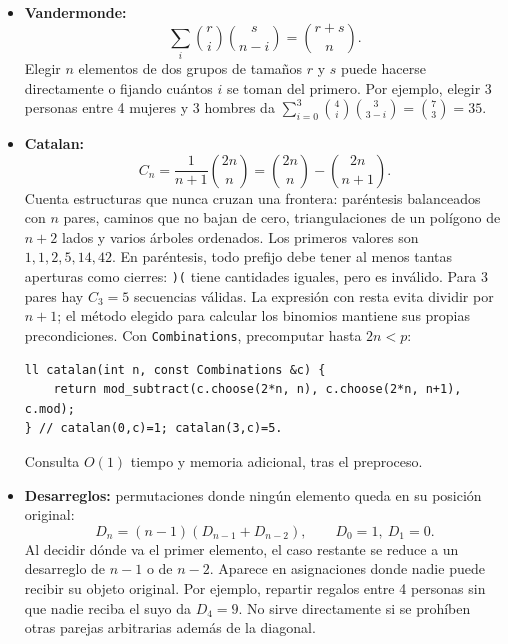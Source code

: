 \begin{itemize}
\begin{lstlisting}[style=cpp]
ll bounded_distributions(int n, const vector<int> &upper,
                         const Combinations &c) {
    int k = upper.size();
    assert(n >= 0 && 1 <= k && k < 63);
    ll answer = 0;
    for (unsigned long long mask = 0; mask < (1ULL << k); ++mask) {
        ll remaining = n;
        for (int i = 0; i < k; ++i) if (mask >> i & 1ULL)
            remaining -= (ll)upper[i] + 1;
        if (remaining < 0) continue; // Interseccion imposible.
        ll term = c.choose((int)remaining + k - 1, k - 1);
        answer = __builtin_popcountll(mask) & 1
               ? mod_subtract(answer, term, c.mod)
               : mod_add(answer, term, c.mod);
    }
    return answer; // n=6, upper={3,3,3}: devuelve 10.
}
\end{lstlisting}

  Tiempo $O(k2^k)$ y memoria adicional $O(1)$ tras el preproceso.
  \item \textbf{Vandermonde:}
  \[
      \sum_i\binom ri\binom s{n-i}=\binom{r+s}n.
  \]
  Elegir $n$ elementos de dos grupos de tama\~nos $r$ y $s$ puede hacerse
  directamente o fijando cu\'antos $i$ se toman del primero. Por ejemplo,
  elegir 3 personas entre 4 mujeres y 3 hombres da
  $\sum_{i=0}^{3}\binom4i\binom3{3-i}=\binom73=35$.
  \item \textbf{Catalan:}
  \[
      C_n=\frac1{n+1}\binom{2n}n
         =\binom{2n}n-\binom{2n}{n+1}.
  \]
  Cuenta estructuras que nunca cruzan una frontera: par\'entesis balanceados con
  $n$ pares, caminos que no bajan de cero, triangulaciones de un pol\'igono de
  $n+2$ lados y varios \'arboles ordenados. Los primeros valores son
  $1,1,2,5,14,42$.
  En par\'entesis, todo prefijo debe tener al menos tantas aperturas como
  cierres: \texttt{)(} tiene cantidades iguales, pero es inv\'alido.
  Para 3 pares hay $C_3=5$ secuencias v\'alidas. La expresi\'on con resta evita
  dividir por $n+1$; el m\'etodo elegido para calcular los binomios mantiene
  sus propias precondiciones.
  Con \texttt{Combinations}, precomputar hasta $2n<p$:

\begin{lstlisting}[style=cpp]
ll catalan(int n, const Combinations &c) {
    return mod_subtract(c.choose(2*n, n), c.choose(2*n, n+1), c.mod);
} // catalan(0,c)=1; catalan(3,c)=5.
\end{lstlisting}

  Consulta $O(1)$ tiempo y memoria adicional, tras el preproceso.
  \item \textbf{Desarreglos:} permutaciones donde ning\'un elemento queda en su
  posici\'on original:
  \[
      D_n=(n-1)(D_{n-1}+D_{n-2}),\qquad D_0=1,\ D_1=0.
  \]
  Al decidir d\'onde va el primer elemento, el caso restante se reduce a un
  desarreglo de $n-1$ o de $n-2$. Aparece en asignaciones donde nadie puede
  recibir su objeto original. Por ejemplo, repartir regalos entre 4 personas
  sin que nadie reciba el suyo da $D_4=9$. No sirve directamente si se proh\'iben
  otras parejas arbitrarias adem\'as de la diagonal.


\end{itemize}
